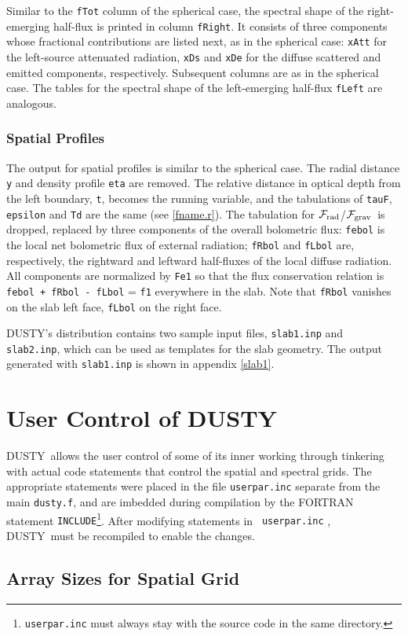 \documentclass[12pt]{article} \usepackage{epsf}
\def\Section#1{\section{\sc #1}}
\def\D  {{\sf DUSTY}}
\def\sub#1{_{\rm #1}}
\def\Frad {\hbox{${\cal F}\sub{rad}$}}
\def\Fgrav{\hbox{${\cal F}\sub{grav}$}}
\begin{document}
Similar to the {\tt fTot} column of the spherical case, the spectral shape of
the right-emerging half-flux is printed in column {\tt fRight}.  It consists of
three components whose fractional contributions are listed next, as in the
spherical case: {\tt xAtt} for the left-source attenuated radiation, {\tt xDs}
and {\tt xDe} for the diffuse scattered and emitted components, respectively.
Subsequent columns are as in the spherical case. The tables for the spectral
shape of the left-emerging half-flux {\tt fLeft} are analogous.

\subsubsection{Spatial Profiles}
The output for spatial profiles is similar to the spherical case. The radial
distance {\tt y} and density profile {\tt eta} are removed.  The relative
distance in optical depth from the left boundary, {\tt t}, becomes the running
variable, and the tabulations of {\tt tauF}, {\tt epsilon} and {\tt Td} are the
same (see \ref{fname.r}).  The tabulation for \Frad/\Fgrav\ is dropped,
replaced by three components of the overall bolometric flux: {\tt febol} is the
local net bolometric flux of external radiation; {\tt fRbol} and {\tt fLbol}
are, respectively, the rightward and leftward half-fluxes of the local diffuse
radiation. All components are normalized by {\tt Fe1} so that the flux
conservation relation is {\tt febol + fRbol - fLbol} = {\tt f1} everywhere in
the slab. Note that {\tt fRbol} vanishes on the slab left face, {\tt fLbol} on
the right face.

\bigskip
\D's distribution contains two sample input files, {\tt slab1.inp} and {\tt
slab2.inp}, which can be used as templates for the slab geometry.  The output
generated with {\tt slab1.inp} is shown in appendix \ref{slab1}.


\Section{User Control of \D}

\D\ allows the user control of some of its inner working through tinkering with
actual code statements that control the spatial and spectral grids. The
appropriate statements were placed in the file {\tt userpar.inc} separate from
the main {\tt dusty.f}, and are imbedded during compilation by the FORTRAN
statement {\tt INCLUDE}\footnote{{\tt userpar.inc} must always stay with the
source code in the same directory.}. After modifying statements in {\tt
userpar.inc} , \D\ must be recompiled to enable the changes.

\subsection{Array Sizes for Spatial Grid}
 \label{Memory}
\end{document}
